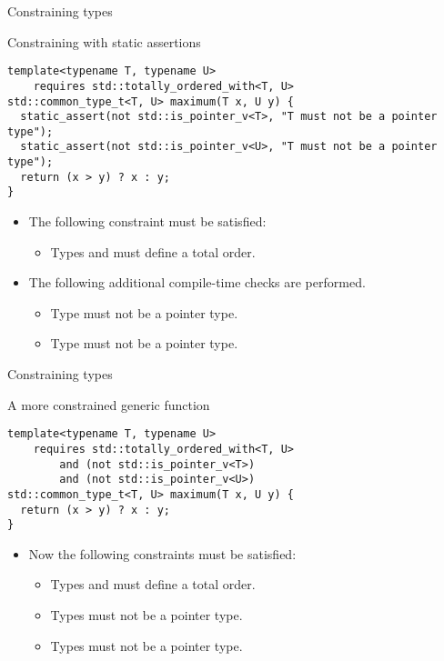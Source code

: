 \begin{frame}[t,fragile]{Constraining types}
\begin{block}{Constraining with static assertions}
\begin{lstlisting}
template<typename T, typename U>
    requires std::totally_ordered_with<T, U>
std::common_type_t<T, U> maximum(T x, U y) {
  static_assert(not std::is_pointer_v<T>, "T must not be a pointer type");
  static_assert(not std::is_pointer_v<U>, "T must not be a pointer type");
  return (x > y) ? x : y;
}
\end{lstlisting}
\end{block}

\begin{itemize}
  \item The following constraint must be satisfied:
    \begin{itemize}
      \item Types  and  must define a total order.
    \end{itemize}
  \item The following additional compile-time checks are performed.
    \begin{itemize}
      \item Type  must not be a pointer type.
      \item Type  must not be a pointer type.
    \end{itemize}
\end{itemize}
\end{frame}

\begin{frame}[t,fragile]{Constraining types}
\begin{block}{A more constrained generic function}
\begin{lstlisting}
template<typename T, typename U>
    requires std::totally_ordered_with<T, U>
        and (not std::is_pointer_v<T>)
        and (not std::is_pointer_v<U>)
std::common_type_t<T, U> maximum(T x, U y) {
  return (x > y) ? x : y;
}
\end{lstlisting}
\end{block}

\begin{itemize}
  \item Now the following constraints must be satisfied:
    \begin{itemize}
      \item Types  and  must define a total order.
      \item Types  must not be a pointer type.
      \item Types  must not be a pointer type.
    \end{itemize}
\end{itemize}
\end{frame}
